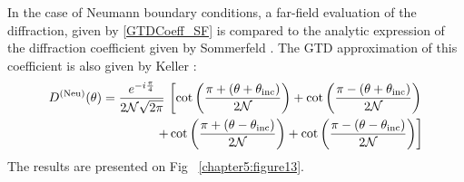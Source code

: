 In the case of Neumann boundary conditions, a far-field evaluation of the diffraction, given by \eqref{GTDCoeff_SF} is compared to the analytic expression of the diffraction coefficient given by Sommerfeld \cite{Sommerfeld}. The GTD approximation of this coefficient is also given by Keller \cite{GTD} :
\begin{align}
\label{GTDCoeff_Neu}
D^{\rm (Neu)}(\theta) = \dfrac{e^{-i\frac{\pi}{4}}}{2\mathcal{N} \sqrt{2\pi}}  \, \left[ \cot \left( \dfrac{\pi + (\theta + \theta_{\rm inc})}{2\mathcal{N}} \right) + \cot \left( \dfrac{\pi - (\theta + \theta_{\rm inc})}{2\mathcal{N}} \right) \right.   \nonumber \\
\left. + \cot \left( \dfrac{\pi + (\theta - \theta_{\rm inc})}{2\mathcal{N}} \right) + \cot \left( \dfrac{\pi - (\theta - \theta_{\rm inc})}{2\mathcal{N}} \right) \right] 
\end{align}
The results are presented on Fig ~\ref{chapter5:figure13}.

